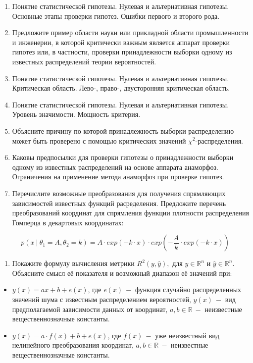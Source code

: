 \documentclass[
  14,
]{article}
\providecommand{\tightlist}{%
  \setlength{\itemsep}{0pt}\setlength{\parskip}{0pt}}
\begin{document}
\begin{enumerate}
\def\labelenumi{\arabic{enumi}.}
\item
  Понятие статистической гипотезы. Нулевая и альтернативная гипотезы.
  Основные этапы проверки гипотез. Ошибки первого и второго рода.
\item
  Предложите пример области науки или прикладной области промышленности
  и инженерии, в которой критически важным является аппарат проверки
  гипотез или, в частности, проверки принадлежности выборки одному из
  известных распределений теории вероятностей.
\item
  Понятие статистической гипотезы. Нулевая и альтернативная гипотезы.
  Критическая область. Лево-, право-, двусторонняя критическая область.
\item
  Понятие статистической гипотезы. Нулевая и альтернативная гипотезы.
  Уровень значимости. Мощность критерия.
\item
  Объясните причину по которой принадлежность выборки распределению
  может быть проверено с помощью критических значений
  \(\chi^2\)-распределения.
\item
  Каковы предпосылки для проверки гипотезы о принадлежности выборки
  одному из известных распределений на основе аппарата анаморфоз.
  Ограничения на применение метода анаморфоз при проверке гипотез.
\item
  Перечислите возможные преобразования для получения спрямляющих
  зависимостей известных функций расределения. Предложите перечень
  преобразований координат для спрямления функции плотности
  распределения Гомперца в декартовых координатах:
\end{enumerate}

\[
p(x\ | \ \theta_1 = A, \theta_2 = k) = A \cdot exp(-k\cdot x) \cdot exp\left(-\frac{A}{k}\cdot exp(-k\cdot x)\right)
\]

\begin{enumerate}
\def\labelenumi{\arabic{enumi}.}
\setcounter{enumi}{7}
\tightlist
\item
  Покажите формулу вычисления метрики \(R^2(y, \hat{y}),\) для
  \(y \in \mathbb{R}^n\) и \(\hat{y} \in \mathbb{R}^n\). Объясните смысл
  её показателя и возможный диапазон её значений при:
\end{enumerate}

\begin{itemize}
\item
  \(y(x) = ax + b + e(x)\), где \(e(x)\ -\) функция случайно
  распределенных значений шума с известным распределением вероятностей,
  \(y(x)\ -\) вид предполагаемой зависимости данных от координат,
  \(a, b \in \mathbb{R} \ -\) неизвестные вещественнозначные константы.
\item
  \(y(x) = a \cdot f(x) + b + e(x)\), где \(f(x) \ -\) уже неизвестный
  вид нелинейного преобразования координат, \(a, b \in \mathbb{R} \ -\)
  неизвестные вещественнозначные константы.
\end{itemize}
\end{document}
